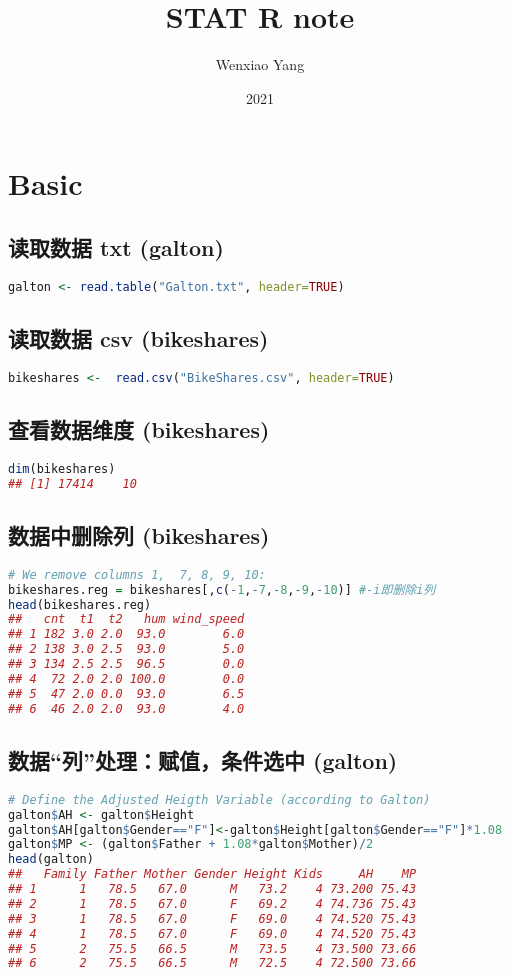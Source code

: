 \documentclass[11pt,a4paper]{article}
\title{STAT R note}
\author[*]{Wenxiao Yang}
\affil[*]{Department of Mathematics, University of Illinois at Urbana-Champaign}
\date{2021}
\begin{document}
\maketitle
\tableofcontents
\newpage

\section{Basic}
\subsection{读取数据 txt (galton)}
\begin{lstlisting}[language=R]
galton <- read.table("Galton.txt", header=TRUE)
\end{lstlisting}
\subsection{读取数据 csv (bikeshares)}
\begin{lstlisting}[language=R]
bikeshares <-  read.csv("BikeShares.csv", header=TRUE)
\end{lstlisting}
\subsection{查看数据维度 (bikeshares)}
\begin{lstlisting}[language=R]
dim(bikeshares)
## [1] 17414    10
\end{lstlisting}

\subsection{数据中删除列 (bikeshares)}
\begin{lstlisting}[language=R]
# We remove columns 1,  7, 8, 9, 10:
bikeshares.reg = bikeshares[,c(-1,-7,-8,-9,-10)] #-i即删除i列
head(bikeshares.reg)
##   cnt  t1  t2   hum wind_speed
## 1 182 3.0 2.0  93.0        6.0
## 2 138 3.0 2.5  93.0        5.0
## 3 134 2.5 2.5  96.5        0.0
## 4  72 2.0 2.0 100.0        0.0
## 5  47 2.0 0.0  93.0        6.5
## 6  46 2.0 2.0  93.0        4.0
\end{lstlisting}


\subsection{数据“列”处理：赋值，条件选中 (galton)}
\begin{lstlisting}[language=R]
# Define the Adjusted Heigth Variable (according to Galton)
galton$AH <- galton$Height
galton$AH[galton$Gender=="F"]<-galton$Height[galton$Gender=="F"]*1.08
galton$MP <- (galton$Father + 1.08*galton$Mother)/2
head(galton)
##   Family Father Mother Gender Height Kids     AH    MP
## 1      1   78.5   67.0      M   73.2    4 73.200 75.43
## 2      1   78.5   67.0      F   69.2    4 74.736 75.43
## 3      1   78.5   67.0      F   69.0    4 74.520 75.43
## 4      1   78.5   67.0      F   69.0    4 74.520 75.43
## 5      2   75.5   66.5      M   73.5    4 73.500 73.66
## 6      2   75.5   66.5      M   72.5    4 72.500 73.66
\end{lstlisting}
\end{document}
